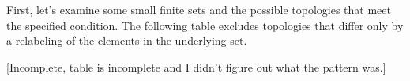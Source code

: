 


First, let's examine some small finite sets and the possible topologies that meet the specified
condition. The following table excludes topologies that differ only by a relabeling of the elements
in the underlying set.

[Incomplete, table is incomplete and I didn't figure out what the pattern was.]

